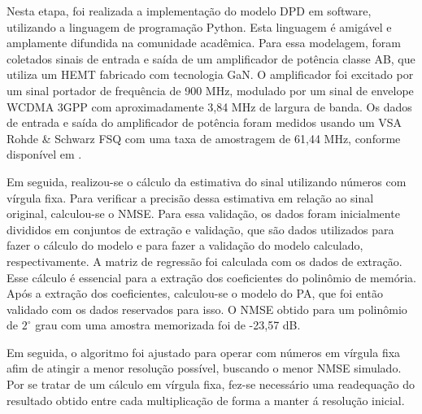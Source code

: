 Nesta etapa, foi realizada a implementação do modelo DPD em software, utilizando a linguagem de programação Python. Esta linguagem é amigável e amplamente difundida na comunidade acadêmica.
Para essa modelagem, foram coletados sinais de entrada e saída de um amplificador de potência classe AB, que utiliza um HEMT fabricado com tecnologia GaN. O amplificador foi excitado por um sinal portador de frequência de 900 MHz, modulado por um sinal de envelope WCDMA 3GPP com aproximadamente 3,84 MHz de largura de banda. Os dados de entrada e saída do amplificador de potência foram medidos usando um VSA Rohde \& Schwarz FSQ com uma taxa de amostragem de 61,44 MHz, conforme disponível em \cite{Bonfim2016}.

Em seguida, realizou-se o cálculo da estimativa do sinal utilizando números com vírgula fixa. Para verificar a precisão dessa estimativa em relação ao sinal original, calculou-se o NMSE. Para essa validação, os dados foram inicialmente divididos em conjuntos de extração e validação, que são dados utilizados para fazer o cálculo do modelo e para fazer a validação do modelo calculado, respectivamente. A matriz de regressão foi calculada com os dados de extração. Esse cálculo é essencial para a extração dos coeficientes do polinômio de memória. Após a extração dos coeficientes, calculou-se o modelo do PA, que foi então validado com os dados reservados para isso. O NMSE obtido para um polinômio de $2^\circ$ grau com uma amostra memorizada foi de -23,57 dB.

Em seguida, o algoritmo foi ajustado para operar com números em vírgula fixa afim de atingir a menor resolução possível, buscando o menor NMSE simulado. Por se tratar de um cálculo em vírgula fixa, fez-se necessário uma readequação do resultado obtido entre cada multiplicação de forma a manter á resolução inicial.

